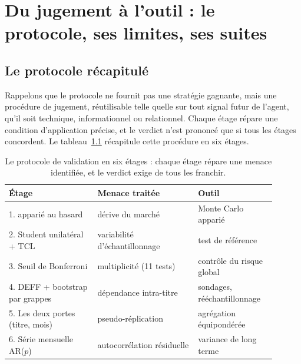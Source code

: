 \chapter{Du jugement à l'outil : le protocole, ses limites, ses suites}
\label{chap:protocole}

\section{Le protocole récapitulé}
\label{sec:protocole}

Rappelons que le protocole ne fournit pas une stratégie gagnante, mais une
procédure de jugement, réutilisable telle quelle sur tout signal futur de
l'agent, qu'il soit technique, informationnel ou relationnel. Chaque étage
répare une condition d'application précise, et le verdict n'est prononcé que
si tous les étages concordent. Le tableau~\ref{tab:protocole} récapitule cette
procédure en six étages.

\begin{table}[H]
\centering
\caption{Le protocole de validation en six étages : chaque étage répare
une menace identifiée, et le verdict exige de tous les franchir.}
\label{tab:protocole}
\small
\begin{tabular}{@{}p{0.30\linewidth}p{0.34\linewidth}p{0.26\linewidth}@{}}
\toprule
Étage & Menace traitée & Outil \\
\midrule
1. \edgevar{} apparié au hasard & dérive du marché & Monte Carlo apparié \\
2. Student unilatéral + TCL & variabilité d'échantillonnage & test de référence \\
3. Seuil de Bonferroni & multiplicité (11 tests) & contrôle du risque global \\
4. DEFF + bootstrap par grappes & dépendance intra-titre & sondages, rééchantillonnage \\
5. Les deux portes (titre, mois) & pseudo-réplication & agrégation équipondérée \\
6. Série mensuelle AR($p$) & autocorrélation résiduelle & variance de long terme \\
\bottomrule
\end{tabular}
\end{table}


